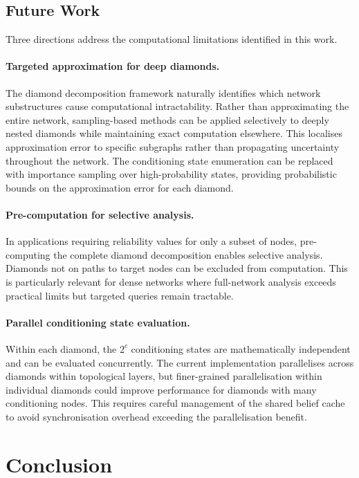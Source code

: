 \subsection{Future Work}

Three directions address the computational limitations identified in this work.

\paragraph{Targeted approximation for deep diamonds.}
The diamond decomposition framework naturally identifies which network substructures cause computational intractability. Rather than approximating the entire network, sampling-based methods can be applied selectively to deeply nested diamonds while maintaining exact computation elsewhere. This localises approximation error to specific subgraphs rather than propagating uncertainty throughout the network. The conditioning state enumeration can be replaced with importance sampling over high-probability states, providing probabilistic bounds on the approximation error for each diamond.

\paragraph{Pre-computation for selective analysis.}
In applications requiring reliability values for only a subset of nodes, pre-computing the complete diamond decomposition enables selective analysis. Diamonds not on paths to target nodes can be excluded from computation. This is particularly relevant for dense networks where full-network analysis exceeds practical limits but targeted queries remain tractable.

\paragraph{Parallel conditioning state evaluation.}
Within each diamond, the $2^c$ conditioning states are mathematically independent and can be evaluated concurrently. The current implementation parallelises across diamonds within topological layers, but finer-grained parallelisation within individual diamonds could improve performance for diamonds with many conditioning nodes. This requires careful management of the shared belief cache to avoid synchronisation overhead exceeding the parallelisation benefit.



\section{Conclusion}

